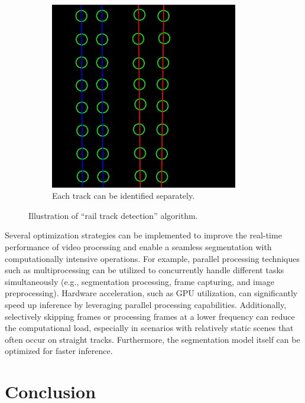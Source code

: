 \documentclass[Master,MDS,english]{BASE/twbook} %
\begin{document}
\begin{figure}
\begin{subfigure}[t]{.215\textwidth}
  \centering
  \includegraphics[width=0.9\textwidth]{images/streaming/img1}
  \caption{Each track can be identified separately. }
\end{subfigure}
\caption{Illustration of ``rail track detection'' algorithm. }
\label{fig:postprocessing2}
\end{figure}


Several optimization strategies can be implemented to improve the real-time performance of video processing and enable a seamless segmentation with computationally intensive operations.
For example, parallel processing techniques such as multiprocessing can be utilized to concurrently handle different tasks simultaneously (e.g., segmentation processing, frame capturing, and image preprocessing). 
Hardware acceleration, such as GPU utilization, can significantly speed up inference by leveraging parallel processing capabilities. 
Additionally, selectively skipping frames or processing frames at a lower frequency can reduce the computational load, especially in scenarios with relatively static scenes that often occur on straight tracks. Furthermore, the segmentation model itself can be optimized for faster inference. 






\chapter{Conclusion} %
\end{document}
